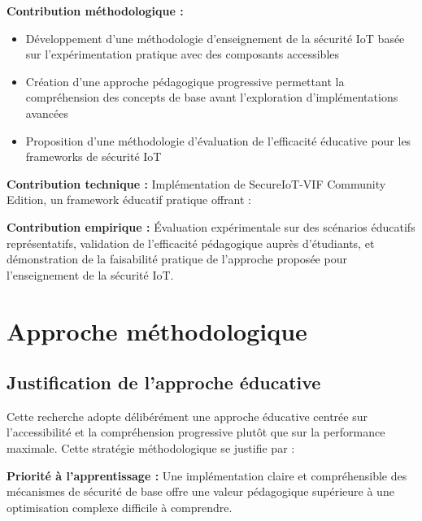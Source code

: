 \textbf{Contribution méthodologique :} 
\begin{itemize}
    \item Développement d'une méthodologie d'enseignement de la sécurité IoT basée sur l'expérimentation pratique avec des composants accessibles
    \item Création d'une approche pédagogique progressive permettant la compréhension des concepts de base avant l'exploration d'implémentations avancées
    \item Proposition d'une méthodologie d'évaluation de l'efficacité éducative pour les frameworks de sécurité IoT
\end{itemize}

\textbf{Contribution technique :} Implémentation de SecureIoT-VIF Community Edition, un framework éducatif pratique offrant :

\textbf{Contribution empirique :} Évaluation expérimentale sur des scénarios éducatifs représentatifs, validation de l'efficacité pédagogique auprès d'étudiants, et démonstration de la faisabilité pratique de l'approche proposée pour l'enseignement de la sécurité IoT.

\section{Approche méthodologique}

\subsection{Justification de l'approche éducative}

Cette recherche adopte délibérément une approche éducative centrée sur l'accessibilité et la compréhension progressive plutôt que sur la performance maximale. Cette stratégie méthodologique se justifie par :

\textbf{Priorité à l'apprentissage :} Une implémentation claire et compréhensible des mécanismes de sécurité de base offre une valeur pédagogique supérieure à une optimisation complexe difficile à comprendre.

